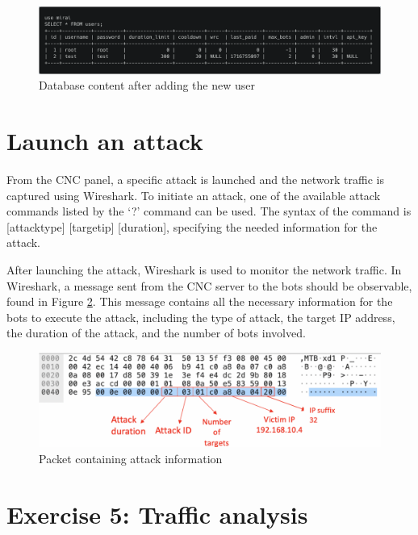 \begin{figure}
    \centering
    \includegraphics[width=1.0\textwidth]{resources/images/table_users.png}
    \caption{Database content after adding the new user}
    \label{fig:table_users}
\end{figure}

\newpage
\section{Launch an attack}

From the CNC panel, a specific attack is launched and the network traffic is captured using Wireshark. To initiate an attack, one of the available attack commands listed by the `?' command can be used. The syntax of the command is [attack\textunderscore type] [target\textunderscore ip] [duration], specifying the needed information for the attack.
 
After launching the attack, Wireshark is used to monitor the network traffic. In Wireshark, a message sent from the CNC server to the bots should be observable, found in Figure \ref{fig:wireshark_attack}. This message contains all the necessary information for the bots to execute the attack, including the type of attack, the target IP address, the duration of the attack, and the number of bots involved.

\begin{figure}
	\centering
	\includegraphics[width=1.0\textwidth]{resources/images/wireshark_attack.png}
	\caption{Packet containing attack information}
	\label{fig:wireshark_attack}
\end{figure}

\section{Exercise 5: Traffic analysis}

